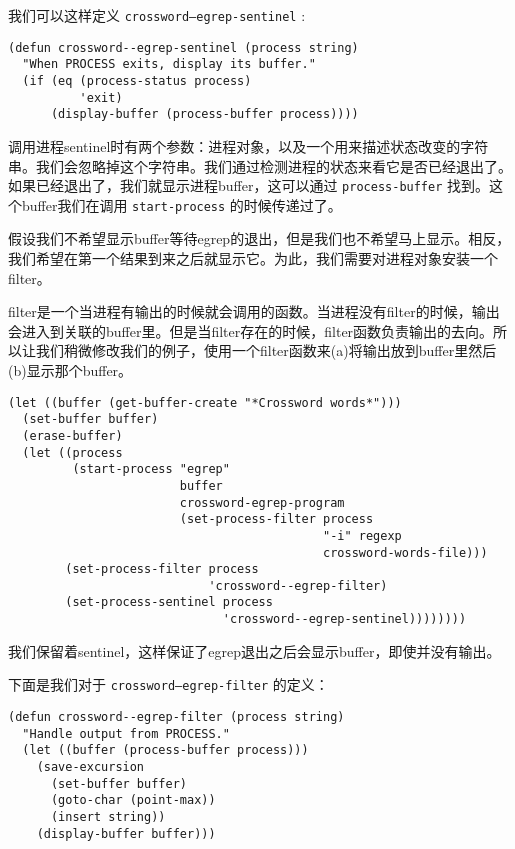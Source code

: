 我们可以这样定义 \texttt{crossword--egrep-sentinel} :

\begin{verbatim}
(defun crossword--egrep-sentinel (process string)
  "When PROCESS exits, display its buffer."
  (if (eq (process-status process)
          'exit)
      (display-buffer (process-buffer process))))
\end{verbatim}

调用进程sentinel时有两个参数：进程对象，以及一个用来描述状态改变的字符串。我们会忽略掉这个字符串。我们通过检测进程的状态来看它是否已经退出了。如果已经退出了，我们就显示进程buffer，这可以通过 \texttt{process-buffer} 找到。这个buffer我们在调用 \texttt{start-process} 的时候传递过了。

假设我们不希望显示buffer等待egrep的退出，但是我们也不希望马上显示。相反，我们希望在第一个结果到来之后就显示它。为此，我们需要对进程对象安装一个filter。

filter是一个当进程有输出的时候就会调用的函数。当进程没有filter的时候，输出会进入到关联的buffer里。但是当filter存在的时候，filter函数负责输出的去向。所以让我们稍微修改我们的例子，使用一个filter函数来(a)将输出放到buffer里然后(b)显示那个buffer。

\begin{verbatim}
(let ((buffer (get-buffer-create "*Crossword words*")))
  (set-buffer buffer)
  (erase-buffer)
  (let ((process
         (start-process "egrep"
                        buffer
                        crossword-egrep-program
                        (set-process-filter process
                                            "-i" regexp
                                            crossword-words-file)))
        (set-process-filter process
                            'crossword--egrep-filter)
        (set-process-sentinel process
                              'crossword--egrep-sentinel))))))))
\end{verbatim}

我们保留着sentinel，这样保证了egrep退出之后会显示buffer，即使并没有输出。

下面是我们对于 \texttt{crossword--egrep-filter} 的定义：

\begin{verbatim}
(defun crossword--egrep-filter (process string)
  "Handle output from PROCESS."
  (let ((buffer (process-buffer process)))
    (save-excursion
      (set-buffer buffer)
      (goto-char (point-max))
      (insert string))
    (display-buffer buffer)))
\end{verbatim}

